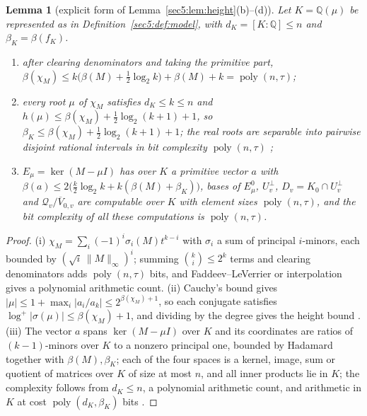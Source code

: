 \documentclass[journal]{IEEEtran}
\theoremstyle{plainn}
\newtheorem{lem}[thm]{Lemma}
\theoremstyle{remark}
\newcommand{\poly}{\operatorname{poly}}
\begin{document}
\begin{lem}[explicit form of Lemma~\ref{sec5:lem:height}(b)--(d)]\label{appBC:lem:charpoly}\label{appBC:lem:root}\label{appBC:cor:root}\label{appBC:lem:bases}\label{appBC:sub:roots}
Let $K=\mathbb{Q}(\mu)$ be represented as in Definition~\ref{sec5:def:model}, with
$d_K=[K:\mathbb{Q}]\le n$ and $\beta_K=\beta(f_K)$.
\begin{enumerate}[label=(\roman*),leftmargin=*]
\item after clearing denominators and taking the primitive part,
$\beta(\chi_M)\le k\bigl(\beta(M)+\tfrac12\log_2 k\bigr)+\beta(M)+k=\poly(n,\tau)$;
\item every root $\mu$ of $\chi_M$ satisfies $d_K\le k\le n$ and
$h(\mu)\le\beta(\chi_M)+\tfrac12\log_2(k+1)+1$, so $\beta_K\le\beta(\chi_M)+\tfrac12\log_2(k+1)+1$;
the real roots are separable into pairwise disjoint rational intervals in bit complexity
$\poly(n,\tau)$ \cite{bpr06};
\item $E_\mu=\ker(M-\mu I)$ has over $K$ a primitive vector $a$ with
$\beta(a)\le2\bigl(\tfrac k2\log_2 k+k(\beta(M)+\beta_K)\bigr)$, bases of $E_\mu^0$,
$U_v^\perp$, $D_v=K_0\cap U_v^\perp$ and $\mathcal{Q}_v/\overline{V}_{0,v}$ are computable over $K$
with element sizes $\poly(n,\tau)$, and the bit complexity of all these computations is
$\poly(n,\tau)$.
\end{enumerate}
\end{lem}

\begin{proof}
(i) $\chi_M=\sum_i(-1)^{i}\sigma_i(M)t^{k-i}$ with $\sigma_i$ a sum of principal $i$-minors, each
bounded by $(\sqrt i\,\|M\|_\infty)^{i}$; summing $\binom ki\le2^{k}$ terms and clearing denominators
adds $\poly(n,\tau)$ bits, and Faddeev--LeVerrier or interpolation gives a polynomial arithmetic count.
(ii) Cauchy's bound gives $|\mu|\le1+\max_i|a_i/a_k|\le2^{\beta(\chi_M)+1}$, so each conjugate
satisfies $\log^{+}|\sigma(\mu)|\le\beta(\chi_M)+1$, and dividing by the degree gives the height bound
\cite{hj13}. (iii) The vector $a$ spans $\ker(M-\mu I)$ over $K$ and its coordinates are ratios of
$(k-1)$-minors over $K$ to a nonzero principal one, bounded by Hadamard together with
$\beta(M),\beta_K$; each of the four spaces is a kernel, image, sum or quotient of matrices over $K$
of size at most $n$, and all inner products lie in $K$; the complexity follows from $d_K\le n$, a
polynomial arithmetic count, and arithmetic in $K$ at cost $\poly(d_K,\beta_K)$ bits
\cite{lan02,vzgg03}.
\end{proof}
\end{document}
